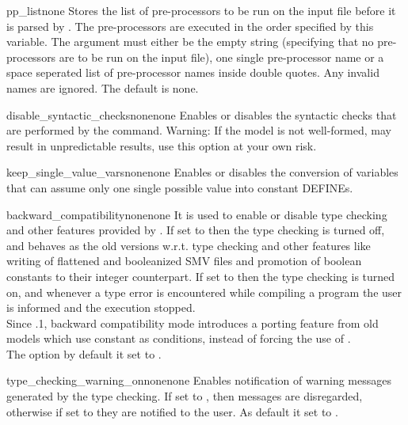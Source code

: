 \begin{nusmvVar} {pp\_list}{}{none}
Stores the list of pre-processors to be run on the input file before
it is parsed by \nusmv. The pre-processors are executed in the order
specified by this variable. The argument must either be the empty
string (specifying that no pre-processors are to be run on the input
file), one single pre-processor name or a space seperated list of
pre-processor names inside double quotes. Any invalid names are
ignored. The default is none.
\end{nusmvVar}



\begin{nusmvVar} {disable\_syntactic\_checks}{none}{none}
Enables or disables the syntactic checks that are performed by
the  command. Warning: If the model
is not well-formed, \nusmv may result in unpredictable results, use
this option at your own risk.
\end{nusmvVar}

\begin{nusmvVar} {keep\_single\_value\_vars}{none}{none}
Enables or disables the conversion of variables that can assume only
one single possible value into constant DEFINEs.
\end{nusmvVar}

\label{ref::backwardcompatibility}
\begin{nusmvVar} {backward\_compatibility}{none}{none}
  It is used to enable or disable type checking and other features
  provided by \NuSMV. If set to  then the type checking is
  turned off, and \nusmv behaves as the old versions w.r.t. type
  checking and other features like writing of flattened and
  booleanized SMV files and promotion of boolean constants to their
  integer counterpart. If set to  then the type checking is
  turned on, and whenever a type error is encountered while compiling
  a \nusmv program the user is informed and the execution stopped.
 \\ 

  Since .1, backward compatibility mode introduces a porting
  feature from old models which use constant  as 
  conditions, instead of forcing the use of .
\\

  The option by default it set to .
\end{nusmvVar}


\begin{nusmvVar}{type\_checking\_warning\_on}{none}{none}
  Enables notification of warning messages generated by the type
  checking. If set to , then messages are disregarded,
  otherwise if set to  they are notified to the user.
%
  As default it set to .
\end{nusmvVar}

